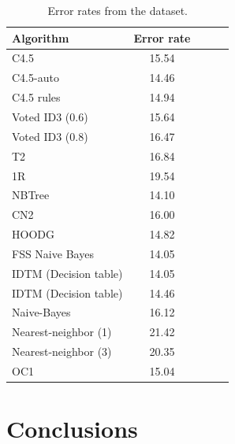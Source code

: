 \documentclass[a4paper]{llncs}
\begin{document}
\begin{table}[ht]
  \begin{center}
  \begin{tabular}{ | l | c | c | c | c |}
    \hline
    \textbf{Algorithm} & \textbf{Error rate} \\ \hline
    C4.5 & 15.54 \\ \hline
    C4.5-auto & 14.46 \\ \hline
    C4.5 rules & 14.94 \\ \hline
    Voted ID3 (0.6) & 15.64 \\ \hline
    Voted ID3 (0.8) & 16.47 \\ \hline
    T2 & 16.84 \\ \hline
    1R & 19.54 \\ \hline
    NBTree & 14.10 \\ \hline
    CN2 & 16.00 \\ \hline
    HOODG & 14.82 \\ \hline
    FSS Naive Bayes & 14.05 \\ \hline
    IDTM (Decision table) & 14.05 \\ \hline
    IDTM (Decision table) & 14.46 \\ \hline
    Naive-Bayes & 16.12 \\ \hline
    Nearest-neighbor (1) & 21.42 \\ \hline
    Nearest-neighbor (3) & 20.35 \\ \hline
    OC1 & 15.04 \\ \hline
  \end{tabular}
  \caption{Error rates from the dataset.}
  \label{tbl:dataset_error_rates}
  \end{center}
\end{table}

\section{Conclusions}
\end{document}
